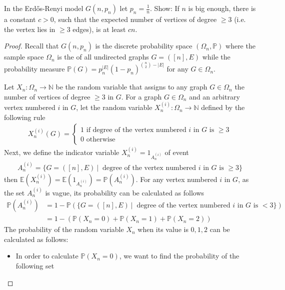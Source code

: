 \begin{problem}
  In the Erdős-Renyi model $G(n, p_{n})$ let $p_{n} = \frac{1}{n}$. Show: If $n$ is big enough, there is a constant $c > 0$, such that the expected number of vertices of degree $\geq 3$ (i.e. the vertex lies in $\geq 3$ edges), is at least $cn$.
\end{problem}
\begin{proof}
  Recall that $G(n, p_{n})$ is the discrete probability space $(\Omega_{n}, \mathbb{P})$ where the sample space $\Omega_{n}$ is the of all undirected graphs $G = ([n], E)$ while the probability measure $\mathbb{P}(G) = p_{n}^{|E|}(1 - p_{n})^{\binom{n}{2} - |E|}$ for any $G \in \Omega_{n}$.

  Let $X_{n} : \Omega_{n} \to \mathbb{N}$ be the random variable that assigns to any graph $G \in \Omega_{n}$ the number of vertices of degree $\geq 3$ in $G$. For a graph $G \in \Omega_{n}$ and an arbitrary vertex numbered $i$ in $G$, let the random variable $X_{n}^{(i)} : \Omega_{n} \to \mathbb{N}$ defined by the following rule
  \begin{align*}
    X_{n}^{(i)}(G) = 
    \begin{cases}
      1 \text{ if degree of the vertex numbered $i$ in $G$ is $\geq 3$} \\
      0 \text{ otherwise}
    \end{cases}
  \end{align*}
  Next, we define the indicator variable $X_{n}^{(i)} = 1_{A_{n}^{(i)}}$ of event
  \begin{align*}
    A_{n}^{(i)} = \{ G = ([n], E) \ | \ \text{ degree of the vertex numbered $i$ in $G$ is $\geq 3$}\} 
  \end{align*}
  then $\mathbb{E}(X_{n}^{(i)}) = \mathbb{E}(1_{A_{n}^{(i)}}) = \mathbb{P}(A_{n}^{(i)})$. For any vertex numbered $i$ in $G$, as the set $A_{n}^{(i)}$ is vague, its probability can be calculated as follows
  \begin{align*}
    \mathbb{P}(A_{n}^{(i)}) &= 1 - \mathbb{P}(\{G = ([n], E) \ | \ \text{ degree of the vertex numbered $i$ in $G$ is $< 3$}\}) \\
                            &= 1 - (\mathbb{P}(X_{n} = 0) + \mathbb{P}(X_{n} = 1) + \mathbb{P}(X_{n} = 2)) \tag{4.1}
  \end{align*}
  The probability of the random variable $X_{n}$ when its value is $0,1,2$ can be calculated as follows:
  \begin{itemize}
    \item In order to calculate $\mathbb{P}(X_{n} = 0)$, we want to find the probability of the following set

\end{itemize}
\end{proof}
